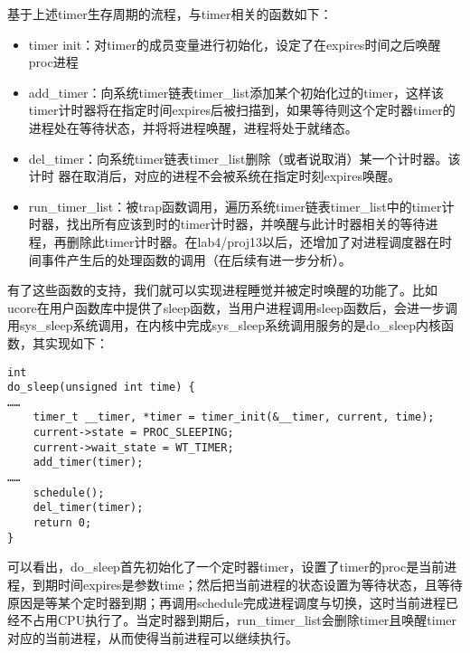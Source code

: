 基于上述timer生存周期的流程，与timer相关的函数如下：

\begin{itemize}
\tightlist
\item
  timer
  init：对timer的成员变量进行初始化，设定了在expires时间之后唤醒proc进程
\item
  add\_timer：向系统timer链表timer\_list添加某个初始化过的timer，这样该timer计时器将在指定时间expires后被扫描到，如果等待则这个定时器timer的进程处在等待状态，并将将进程唤醒，进程将处于就绪态。
\item
  del\_timer：向系统timer链表timer\_list删除（或者说取消）某一个计时器。该计时
  器在取消后，对应的进程不会被系统在指定时刻expires唤醒。
\item
  run\_timer\_list：被trap函数调用，遍历系统timer链表timer\_list中的timer计时器，找出所有应该到时的timer计时器，并唤醒与此计时器相关的等待进程，再删除此timer计时器。在lab4/proj13以后，还增加了对进程调度器在时间事件产生后的处理函数的调用（在后续有进一步分析）。
\end{itemize}

有了这些函数的支持，我们就可以实现进程睡觉并被定时唤醒的功能了。比如ucore在用户函数库中提供了sleep函数，当用户进程调用sleep函数后，会进一步调用sys\_sleep系统调用，在内核中完成sys\_sleep系统调用服务的是do\_sleep内核函数，其实现如下：

\begin{lstlisting}
int
do_sleep(unsigned int time) {
……
    timer_t __timer, *timer = timer_init(&__timer, current, time);
    current->state = PROC_SLEEPING;
    current->wait_state = WT_TIMER;
    add_timer(timer);
……
    schedule();
    del_timer(timer);
    return 0;
}
\end{lstlisting}

可以看出，do\_sleep首先初始化了一个定时器timer，设置了timer的proc是当前进程，到期时间expires是参数time；然后把当前进程的状态设置为等待状态，且等待原因是等某个定时器到期；再调用schedule完成进程调度与切换，这时当前进程已经不占用CPU执行了。当定时器到期后，run\_timer\_list会删除timer且唤醒timer对应的当前进程，从而使得当前进程可以继续执行。
